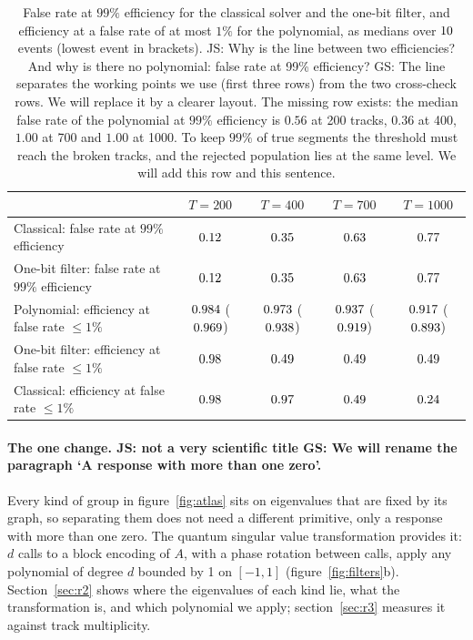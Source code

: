 \documentclass[11pt,a4paper]{article}
\newcommand{\js}[1]{{\color{blue} JS: #1 }}
\newcommand{\gs}[1]{{\color{orange!85!black} GS: #1 }}
\begin{document}
\begin{table}[t]
\centering\small
\caption{False rate at $99\%$ efficiency for the classical solver and the one-bit filter, and
efficiency at a false rate of at most $1\%$ for the polynomial, as medians over $10$ events
(lowest event in brackets). \js{Why is the line between two efficiencies? And why is there no polynomial: false rate at 99\% efficiency? } \gs{The line separates the working points we use (first three rows) from the two cross-check rows. We will replace it by a clearer layout. The missing row exists: the median false rate of the polynomial at $99\%$ efficiency is $0.56$ at 200 tracks, $0.36$ at 400, $1.00$ at 700 and $1.00$ at 1000. To keep $99\%$ of true segments the threshold must reach the broken tracks, and the rejected population lies at the same level. We will add this row and this sentence.}}
\label{tab:headline}
\begin{tabular}{lcccc}\toprule
 & $T=200$ & $T=400$ & $T=700$ & $T=1000$\\\midrule
Classical: false rate at $99\%$ efficiency & $0.12$ & $0.35$ & $0.63$ & $0.77$\\
One-bit filter: false rate at $99\%$ efficiency & $0.12$ & $0.35$ & $0.63$ & $0.77$\\
Polynomial: efficiency at false rate $\le1\%$ & $0.984$ ($0.969$) & $0.973$ ($0.938$) & $0.937$ ($0.919$) & $0.917$ ($0.893$)\\
\midrule
One-bit filter: efficiency at false rate $\le1\%$ & $0.98$ & $0.49$ & $0.49$ & $0.49$\\
Classical: efficiency at false rate $\le1\%$ & $0.98$ & $0.97$ & $0.49$ & $0.24$\\\bottomrule
\end{tabular}
\end{table}

\paragraph{The one change. \js{not a very scientific title} \gs{We will rename the paragraph `A response with more than one zero'.}} Every kind of group in figure~\ref{fig:atlas} sits on eigenvalues that are fixed by its graph, so
separating them does not need a different primitive, only a response with more than one zero.
The quantum singular value transformation provides it: $d$ calls to a block encoding of $A$,
with a phase rotation between calls, apply any polynomial of degree $d$ bounded by 1 on $[-1,1]$
(figure~\ref{fig:filters}b). Section~\ref{sec:r2} shows where the eigenvalues of each kind lie,
what the transformation is, and which polynomial we apply; section~\ref{sec:r3} measures it against
track multiplicity.
\end{document}
